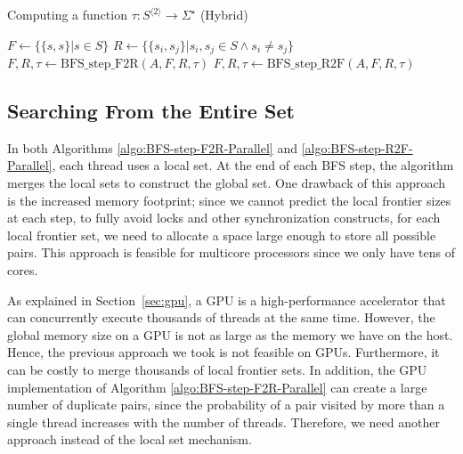\documentclass[12pt]{article}
\begin{document}
\begin{algorithm}[ht]
	\label{algo:BFS-Hybrid}
	\caption{Computing a function $\tau : S^{\langle 2 \rangle} \rightarrow \Sigma^\star$ (Hybrid)}
	
	

	
	$F \longleftarrow \{ \{ s,s \} | s \in S \}$\;
	$R \longleftarrow \{ \{ s_i,s_j \} | s_i,s_j \in S \wedge s_i \neq s_j \}$\;
	{
		{
			$F,R,\tau \longleftarrow \mbox{BFS\_step\_F2R}(A,F,R,\tau)$\;
		}
		\Else
		{
			$F,R,\tau \longleftarrow \mbox{BFS\_step\_R2F}(A,F,R,\tau)$\;
		}
	}
\end{algorithm}

\subsection{Searching From the Entire Set}
\label{sec:BFS-entire-set}
In both Algorithms \ref{algo:BFS-step-F2R-Parallel} and \ref{algo:BFS-step-R2F-Parallel}, each thread uses a local set. At the end of each BFS step, the algorithm merges the local sets to construct the global set. One drawback of this approach is the increased memory footprint; since we cannot predict the local frontier sizes at each step, to fully avoid locks and other synchronization constructs, for each local frontier set, we need to allocate a space large enough to store all possible pairs. This approach is feasible for multicore processors since we only have tens of cores. 

As explained in Section~\ref{sec:gpu}, a GPU is a high-performance accelerator that can concurrently execute thousands of threads at the same time. However, the global memory size on a GPU is not as large as the memory we have on the host. Hence, the previous approach we took is not feasible on GPUs. Furthermore, it can be costly to merge thousands of local frontier sets. In addition, the GPU implementation of Algorithm \ref{algo:BFS-step-F2R-Parallel} can create a large number of duplicate pairs, since the probability of a pair visited by more than a single thread increases with the number of threads. Therefore, we need another approach instead of the local set mechanism. 
\end{document}
